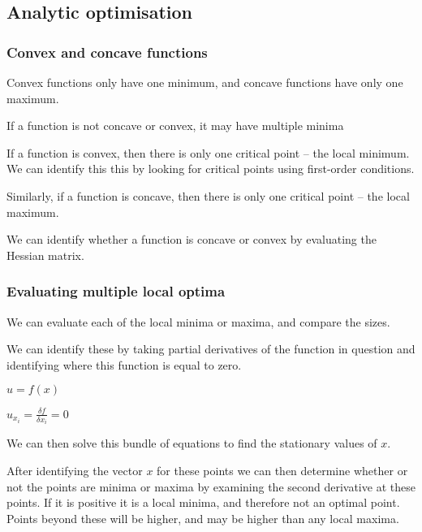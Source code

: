 
\subsection{Analytic optimisation}

\subsubsection{Convex and concave functions}

Convex functions only have one minimum, and concave functions have only one maximum.

If a function is not concave or convex, it may have multiple minima

If a function is convex, then there is only one critical point – the local minimum. We can identify this this by looking for critical points using first-order conditions.

Similarly, if a function is concave, then there is only one critical point – the local maximum.

We can identify whether a function is concave or convex by evaluating the Hessian matrix.

\subsubsection{Evaluating multiple local optima}

We can evaluate each of the local minima or maxima, and compare the sizes.

We can identify these by taking partial derivatives of the function in question and identifying where this function is equal to zero.

$u=f(x)$

$u_{x_i}=\frac{\delta f}{\delta x_i}=0$

We can then solve this bundle of equations to find the stationary values of \(x\).

After identifying the vector \(x\) for these points we can then  determine whether or not the points are minima or maxima by  examining the second derivative at these points. If it is positive it is a local minima, and therefore not an optimal point. Points beyond these will be higher, and may be higher than any local maxima.


